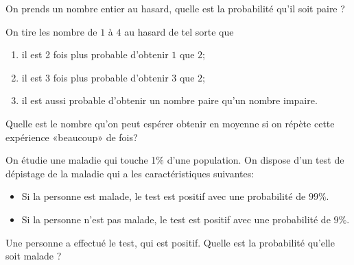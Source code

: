 \documentclass[a4paper,11pt,reqno]{amsart}
\begin{document}

\begin{exo}

  On prends un nombre entier au hasard, quelle est la probabilité qu'il soit paire ?
\end{exo}
\vspace*{\fill}


\begin{exo}

  On tire les nombre de $1$ à $4$ au hasard de tel sorte que
  \begin{enumerate}
    \item il est 2 fois plus probable d'obtenir $1$ que $2$;
    \item il est 3 fois plus probable d'obtenir $3$ que $2$;
    \item il est aussi probable d'obtenir un nombre paire qu'un nombre impaire.
  \end{enumerate}
  Quelle est le nombre qu'on peut espérer obtenir en moyenne si on répète cette expérience «beaucoup» de fois?
\end{exo}
\vspace*{\fill}


\begin{exo}

  On étudie une maladie qui touche 1$\%$ d'une population. On dispose d'un test  de dépistage de la maladie qui a les caractéristiques suivantes:

  \begin{itemize}
    \item Si la personne est malade, le test est positif avec une probabilité de $99 \%$.
    \item Si la personne n'est pas malade, le test est positif avec une probabilité de $9 \%$.
  \end{itemize}

  Une personne a effectué le test, qui est positif. Quelle est la probabilité qu'elle soit malade ?
\end{exo}
\vspace*{\fill}
\end{document}
